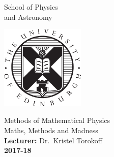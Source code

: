\begin{titlepage}
\begin{minipage}[b]{0.6\textwidth}
        {\huge School of Physics\\ and Astronomy\\}
\end{minipage}
\hfill
\begin{minipage}[t]{40mm}
        \includegraphics[width=40mm]{crest.eps}
\end{minipage}
\vspace*{4cm}
\begin{center}
{\large{} Methods of Mathematical Physics\\}
{\Huge{}Maths, Methods and Madness\\}\vspace{4cm}
{\Large {\bfseries Lecturer:} Dr.~Kristel Torokoff\\}\vspace{1cm}
{\LARGE\bfseries 2017-18\\}
\end{center}
\vspace{\fill}

\end{titlepage}
